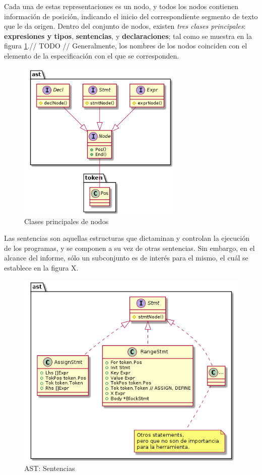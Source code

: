 Cada una de estas representaciones es un nodo, y todos los nodos contienen información de posición,
indicando el inicio del correspondiente segmento de texto que le da origen.
Dentro del conjunto de nodos, existen \textit{tres clases principales}: \textbf{expresiones y tipos},
\textbf{sentencias}, y \textbf{declaraciones}; tal como se muestra en la figura \ref{NodeClasses}.// TODO //
Generalmente, los nombres de los nodos coinciden con el elemento de la especificación con el que
se corresponden.

\begin{figure}[H]
  \label{NodeClasses}
  \includegraphics[width=8cm]{implementation/ast_nodes.png}
  \centering
  \caption{Clases principales de nodos}
\end{figure}

Las sentencias son aquellas estructuras que dictaminan y controlan la ejecución de los programas,
y se componen a su vez de otras sentencias.
Sin embargo, en el alcance del informe, sólo un subconjunto es de interés para el mismo,
el cuál se establece en la figura X. 

\begin{figure}[H]
  \includegraphics[width=12cm]{implementation/ast_statements.png}
  \centering
  \caption{AST: Sentencias}
\end{figure}

